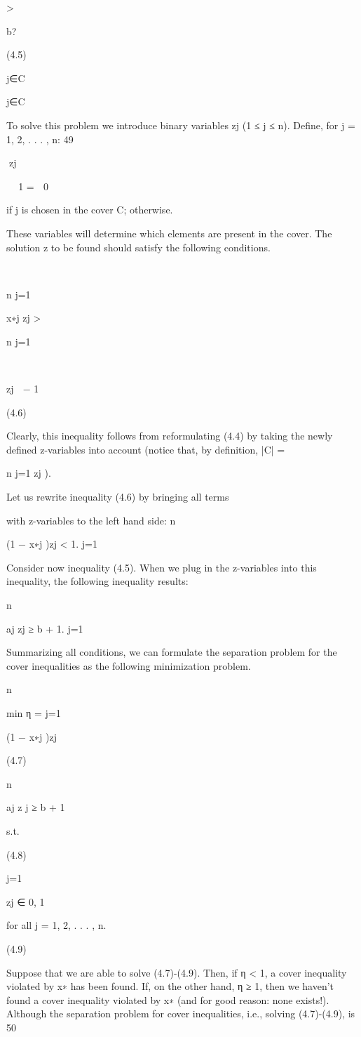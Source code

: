 >

b?

(4.5)

j∈C

j∈C

To solve this problem we introduce binary variables zj (1 ≤ j ≤ n). Define, for j = 1, 2, . . . , n:
49

zj


 1
=
 0

if j is chosen in the cover C;
otherwise.

These variables will determine which elements are present in the cover. The solution z to be found should
satisfy the following conditions.



n
j=1

x∗j zj > 

n
j=1



zj  − 1

(4.6)

Clearly, this inequality follows from reformulating (4.4) by taking the newly defined z-variables into
account (notice that, by definition, |C| =

n
j=1 zj ).

Let us rewrite inequality (4.6) by bringing all terms

with z-variables to the left hand side:
n

(1 − x∗j )zj < 1.
j=1

Consider now inequality (4.5). When we plug in the z-variables into this inequality, the following inequality results:

n

aj zj ≥ b + 1.
j=1

Summarizing all conditions, we can formulate the separation problem for the cover inequalities as the
following minimization problem.

n

min η =
j=1

(1 − x∗j )zj

(4.7)

n

aj z j ≥ b + 1

s.t.

(4.8)

j=1

zj ∈ {0, 1}

for all j = 1, 2, . . . , n.

(4.9)

Suppose that we are able to solve (4.7)-(4.9). Then, if η < 1, a cover inequality violated by x∗ has been
found. If, on the other hand, η ≥ 1, then we haven't found a cover inequality violated by x∗ (and for good
reason: none exists!). Although the separation problem for cover inequalities, i.e., solving (4.7)-(4.9), is
50

